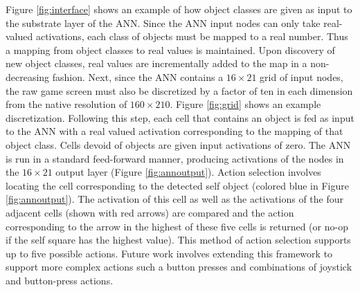 \documentclass{sig-alternate}
\begin{document}
Figure \ref{fig:interface} shows an example of how object classes are given as input to the substrate layer of the ANN. Since the ANN input nodes can only take real-valued activations, each class of objects must be mapped to a real number. Thus a mapping from object classes to real values is maintained. Upon discovery of new object classes, real values are incrementally added to the map in a non-decreasing fashion. Next, since the ANN contains a $16\times 21$ grid of input nodes, the raw game screen must also be discretized by a factor of ten in each dimension from the native resolution of $160\times 210$. Figure \ref{fig:grid} shows an example discretization. Following this step, each cell that contains an object is fed as input to the ANN with a real valued activation corresponding to the mapping of that object class. Cells devoid of objects are given input activations of zero. The ANN is run in a standard feed-forward manner, producing activations of the nodes in the $16\times 21$ output layer (Figure \ref{fig:annoutput}). Action selection involves locating the cell corresponding to the detected self object (colored blue in Figure \ref{fig:annoutput}). The activation of this cell as well as the activations of the four adjacent cells (shown with red arrows) are compared and the action corresponding to the arrow in the highest of these five cells is returned (or no-op if the self square has the highest value). This method of action selection supports up to five possible actions. Future work involves extending this framework to support more complex actions such a button presses and combinations of joystick and button-press actions.

\end{document}
